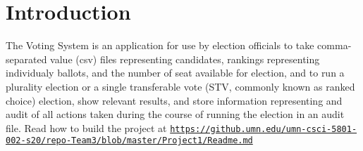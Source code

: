 \hypertarget{index_intro_sec}{}\section{Introduction}\label{index_intro_sec}
The Voting System is an application for use by election officials to take comma-\/separated value (csv) files representing candidates, rankings representing individualy ballots, and the number of seat available for election, and to run a plurality election or a single transferable vote (S\+TV, commonly known as ranked choice) election, show relevant results, and store information representing and audit of all actions taken during the course of running the election in an audit file. Read how to build the project at \href{https://github.umn.edu/umn-csci-5801-002-s20/repo-Team3/blob/master/Project1/Readme.md}{\tt https\+://github.\+umn.\+edu/umn-\/csci-\/5801-\/002-\/s20/repo-\/\+Team3/blob/master/\+Project1/\+Readme.\+md} 